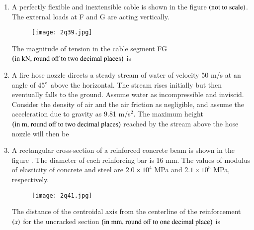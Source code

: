 \documentclass[journal,12pt,onecolumn]{article}
\theoremstyle{remark}
\begin{document}
\begin{enumerate}
\hfill{}

\item A perfectly flexible and inextensible cable is shown in the figure  $\left(\text{not to scale}\right)$. The external loads at F and G are acting vertically.
\begin{figure}[H]
    \centering
    \texttt{[image: 2q39.jpg]}
    \caption{}
    \label{fig:q39}
\end{figure}
The magnitude of tension in the cable segment FG $\left(\text{in kN, round off to two decimal places}\right)$ is \underline{\hspace{2cm}}

\hfill{}

\item A fire hose nozzle directs a steady stream of water of velocity 50 m/s at an angle of 45$\degree$ above the horizontal. The stream rises initially but then eventually falls to the ground. Assume water as incompressible and inviscid. Consider the density of air and the air friction as negligible, and assume the acceleration due to gravity as 9.81 m/s$^2$. The maximum height $\left(\text{in m, round off to two decimal places}\right)$ reached by the stream above the hose nozzle will then be \underline{\hspace{2cm}}

\hfill{}

\item A rectangular cross-section of a reinforced concrete beam is shown in the figure . The diameter of each reinforcing bar is 16 mm. The values of modulus of elasticity of concrete and steel are $2.0 \times 10^4$ MPa and $2.1 \times 10^5$ MPa, respectively.
\begin{figure}[H]
    \centering
    \texttt{[image: 2q41.jpg]}
    \caption{}
    \label{fig:q41}
\end{figure}
The distance of the centroidal axis from the centerline of the reinforcement $\left(x\right)$ for the uncracked section $\left(\text{in mm, round off to one decimal place}\right)$ is \underline{\hspace{2cm}}

\hfill{}


\end{enumerate}
\end{document}
